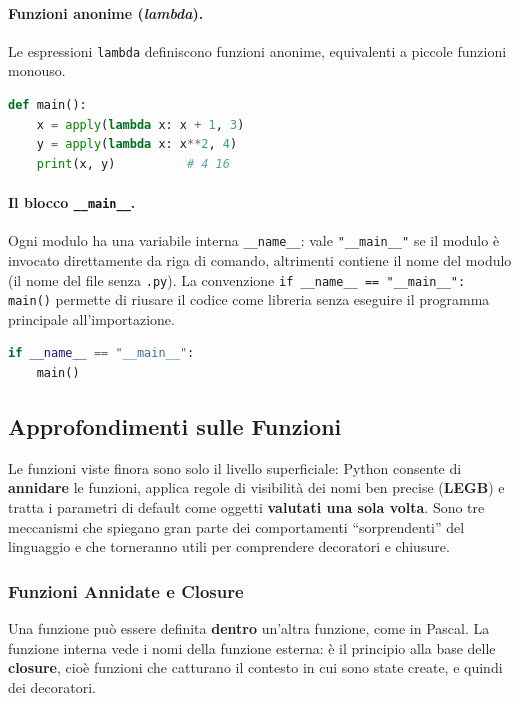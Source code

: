\documentclass[12pt]{extarticle}
\begin{document}
\paragraph{Funzioni anonime (\textit{lambda}).} Le espressioni \texttt{lambda} definiscono funzioni anonime, equivalenti a piccole funzioni monouso.

\begin{lstlisting}[language=Python]
def main():
    x = apply(lambda x: x + 1, 3)
    y = apply(lambda x: x**2, 4)
    print(x, y)          # 4 16
\end{lstlisting}

\paragraph{Il blocco \texttt{\_\_main\_\_}.} Ogni modulo ha una variabile interna \texttt{\_\_name\_\_}: vale \texttt{"\_\_main\_\_"} se il modulo è invocato direttamente da riga di comando, altrimenti contiene il nome del modulo (il nome del file senza \texttt{.py}). La convenzione \texttt{if \_\_name\_\_ == "\_\_main\_\_": main()} permette di riusare il codice come libreria senza eseguire il programma principale all'importazione.

\begin{lstlisting}[language=Python]
if __name__ == "__main__":
    main()
\end{lstlisting}

\subsection{Approfondimenti sulle Funzioni}

\noindent Le funzioni viste finora sono solo il livello superficiale: Python consente di \textbf{annidare} le funzioni, applica regole di visibilità dei nomi ben precise (\textbf{LEGB}) e tratta i parametri di default come oggetti \textbf{valutati una sola volta}. Sono tre meccanismi che spiegano gran parte dei comportamenti ``sorprendenti'' del linguaggio e che torneranno utili per comprendere decoratori e chiusure.

\subsubsection{Funzioni Annidate e Closure}

\noindent Una funzione può essere definita \textbf{dentro} un'altra funzione, come in Pascal. La funzione interna vede i nomi della funzione esterna: è il principio alla base delle \textbf{closure}, cioè funzioni che catturano il contesto in cui sono state create, e quindi dei decoratori.
\end{document}
